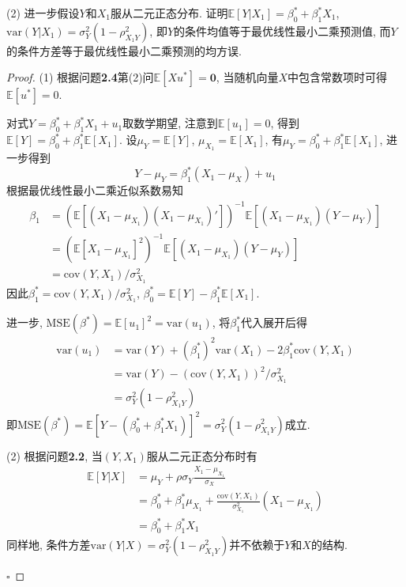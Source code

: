 \documentclass[cn,12pt,math=mtpro2,citestyle=gb7714-2015,bibstyle=gb7714-2015,twocol,mode=simple]{elegantbook}
\newcommand{\E}{\mathbb{E}}
\newcommand{\var}{\text{var}}
\begin{document}
(2) 进一步假设$Y$和$X_1$服从二元正态分布. 证明$\E[Y|X_1]=\beta_0^{\ast}+\beta_1^{\ast}X_1$, $\var(Y|X_1)=\sigma^2_Y(1-\rho^2_{X_1Y})$, 即$Y$的条件均值等于最优线性最小二乘预测值, 而$Y$的条件方差等于最优线性最小二乘预测的均方误.

\begin{proof}
  (1) 根据问题\textbf{2.4}第(2)问$\E[Xu^{\ast}]=\mathbf{0}$, 当随机向量$X$中包含常数项时可得$\E[u^{\ast}]=0$.

  对式$Y=\beta_0^{\ast}+\beta_1^{\ast}X_1+u_1$取数学期望, 注意到$\E[u_1]=0$, 得到$\E[Y]=\beta_0^{\ast}+\beta_1^{\ast}\E[X_1]$. 设$\mu_Y=\E[Y]$, $\mu_{X_1}=\E[X_1]$, 有$\mu_Y=\beta_0^{\ast}+\beta_1^{\ast}\E[X_1]$, 进一步得到
  $$Y-\mu_Y=\beta_1^{\ast}(X_1-\mu_X)+u_1$$
  根据最优线性最小二乘近似系数易知
  \begin{align}
  \beta_1&=\left(\E[(X_1-\mu_{X_1})(X_1-\mu_{X_1})'] \right)^{-1}\E[(X_1-\mu_{X_1})(Y-\mu_Y)] \nonumber \\
  &=\left(\E[X_1-\mu_{X_1}]^2 \right)^{-1}\E[(X_1-\mu_{X_1})(Y-\mu_Y)] \nonumber \\
  &=\text{cov}(Y, X_1)/\sigma^2_{X_1} \nonumber
  \end{align}
  因此$\beta_1^{\ast}=\text{cov}(Y, X_1)/\sigma^2_{X_1}$, $\beta_0^{\ast}=\E[Y]-\beta_1^{\ast}\E[X_1]$.

  进一步, $\text{MSE}(\beta^{\ast})=\E[u_1]^2=\var(u_1)$, 将$\beta_1^{\ast}$代入展开后得
  \begin{align}
  \var(u_1)&=\var(Y)+(\beta_1^{\ast})^2\var(X_1)-2\beta_1^{\ast}\text{cov}(Y, X_1) \nonumber \\
  &=\var(Y)-(\text{cov}(Y,X_1))^2/\sigma^2_{X_1} \nonumber \\
  &=\sigma^2_Y(1-\rho^2_{X_1Y}) \nonumber
  \end{align}
  即$\text{MSE}(\beta^{\ast})=\E[Y-(\beta_0^{\ast}+\beta_1^{\ast}X_1)]^2=\sigma^2_Y(1-\rho^2_{X_1Y})$成立.

  (2) 根据问题\textbf{2.2}, 当$(Y, X_1)$服从二元正态分布时有
  \begin{align}
  \E[Y|X]&=\mu_Y+\rho\sigma_Y\frac{X_1-\mu_{X_1}}{\sigma_X} \nonumber \\
  &=\beta_0^{\ast}+\beta_1^{\ast}\mu_{X_1}+\frac{\text{cov}(Y, X_1)}{\sigma^2_{X_1}}(X_1-\mu_{X_1}) \nonumber \\
  &=\beta_0^{\ast}+\beta_1^{\ast}X_1 \nonumber
  \end{align}
  同样地, 条件方差$\var(Y|X)=\sigma_Y^2(1-\rho_{X_1Y}^2)$并不依赖于$Y$和$X$的结构.

  $\square$
\end{proof}
\end{document}
